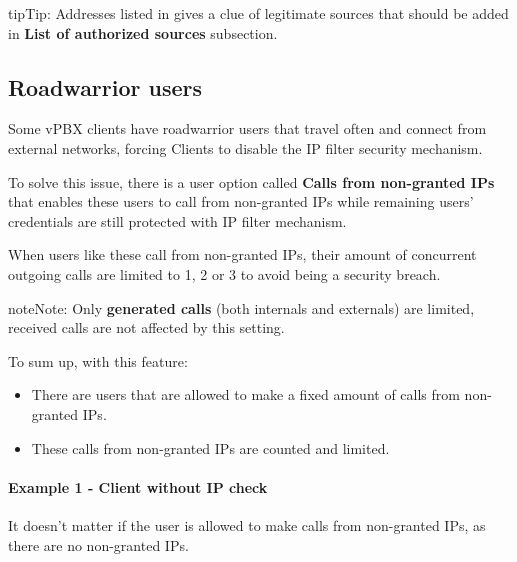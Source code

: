 \documentclass[letterpaper,10pt,english]{sphinxmanual}
\begin{document}
\begin{notice}{tip}{Tip:}
Addresses listed in {\hyperref[administration_portal/brand/views/ipfilter_blocked_addresses:ip\string-filter\string-blocked\string-addresses]{}} gives a clue of legitimate sources that should be
added in \textbf{List of authorized sources} subsection.
\end{notice}


\subsection{Roadwarrior users}
\label{security_and_maintenance/security/authorized_ip_ranges:id2}\label{security_and_maintenance/security/authorized_ip_ranges:roadwarrior-users}
Some vPBX clients have roadwarrior users that travel often and connect from external
networks, forcing Clients to disable the IP filter security mechanism.

To solve this issue, there is a user option called \textbf{Calls from non-granted IPs}
that enables these users to call from non-granted IPs while remaining users' credentials
are still protected with IP filter mechanism.

When users like these call from non-granted IPs, their amount of concurrent
outgoing calls are limited to 1, 2 or 3 to avoid being a security breach.

\begin{notice}{note}{Note:}
Only \textbf{generated calls} (both internals and externals) are limited,
received calls are not affected by this setting.
\end{notice}

To sum up, with this feature:
\begin{itemize}
\item {} 
There are users that are allowed to make a fixed amount of calls from
non-granted IPs.

\item {} 
These calls from non-granted IPs are counted and limited.

\end{itemize}
\paragraph{Example 1 - Client without IP check}

It doesn't matter if the user is allowed to make calls from non-granted IPs,
as there are no non-granted IPs.
\end{document}
